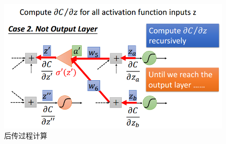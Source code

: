 \begin{figure}[htb]
	\includegraphics[scale=0.4]{pic/backwardpass_05}
	\caption{后传过程计算}
	\label{fig:backwardpass}
\end{figure}